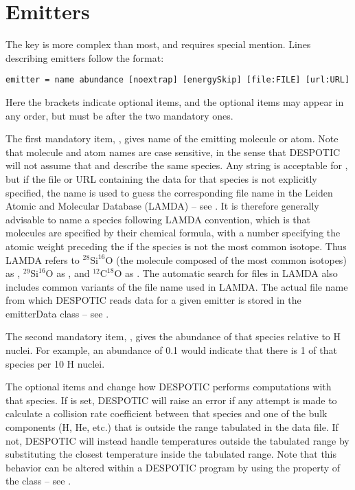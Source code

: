 \documentclass[letterpaper,10pt,english]{sphinxmanual}
\begin{document}
\section{Emitters}
\label{cloudfiles:emitters}\label{cloudfiles:ssec-emitters}
The  key is more complex than most, and requires special
mention. Lines describing emitters follow the format:

\begin{Verbatim}[commandchars=\\\{\}]
emitter = name abundance [noextrap] [energySkip] [file:FILE] [url:URL]
\end{Verbatim}

Here the brackets indicate optional items, and the optional items may
appear in any order, but must be after the two mandatory ones.

The first mandatory item, , gives name of the emitting
molecule or atom. Note that molecule and atom names are case
sensitive, in the sense that DESPOTIC will not assume that  and
 describe the same species. Any string is acceptable for
, but if the file or URL containing the data for that species
is not explicitly specified, the name is used to guess the
corresponding file name in the Leiden Atomic and Molecular Database
(LAMDA) -- see {\hyperref[data:sec-data]{\emph{}}}. It is therefore generally advisable
to name a species following LAMDA convention, which is that molecules
are specified by their chemical formula, with a number specifying the
atomic weight preceding the if the species is not the most common
isotope. Thus LAMDA refers to \(^{28}\mathrm{Si}^{16}\mathrm{O}\)
(the molecule composed of the most common isotopes) as ,
\(^{29}\mathrm{Si}^{16}\mathrm{O}\) as , and
\(^{12}\mathrm{C}^{18}\mathrm{O}\) as . The automatic
search for files in LAMDA also includes common variants of
the file name used in LAMDA. The actual file name from
which DESPOTIC reads data for a given emitter is stored in
the emitterData class -- see {\hyperref[fulldoc:sssec-full-emitterdata]{\emph{}}}.

The second mandatory item, , gives the abundance of that
species relative to H nuclei. For example, an abundance of 0.1 would
indicate that there is 1 of that species per 10 H nuclei.

The optional items  and  change how DESPOTIC
performs computations with that species. If  is set,
DESPOTIC will raise an error if any attempt is made to calculate a
collision rate coefficient between that species and one of the bulk
components (H, He, etc.) that is outside the range tabulated in the
data file. If not, DESPOTIC will instead handle temperatures outside
the tabulated range by substituting the closest temperature inside the
tabulated range. Note that this behavior can be altered within a
DESPOTIC program by using the  property of the
 class -- see {\hyperref[fulldoc:sec-fulldoc]{\emph{}}}.
\end{document}
